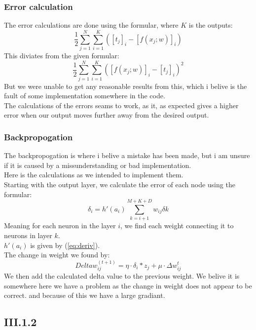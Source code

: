 \documentclass{article}
\begin{document}
\subsubsection{Error calculation}
The error calculations are done using the formular, where $K$ is the outputs:
\begin{equation} \label{eq:badError}
    \frac{1}{2} \sum_{j = 1}^{N}\sum_{i = 1}^{K}([t_j]_i - [f(x_j;w)]_i)
\end{equation}
This diviates from the given formular:
\begin{equation}
    \frac{1}{2} \sum_{j = 1}^{N} \sum_{i = 1}^{K}([f(x_j;w)]_i - [t_j]_i)^2
\end{equation}
But we were unable to get any reasonable results from this, which i belive is the fault of some implementation somewhere in the code.\\
The calculations of the errors seams to work, as it, as expected gives a higher error when our output moves further away from the desired output.\\

\subsubsection{Backpropogation}
The backpropogation is where i belive a mistake has been made, but i am unsure if it is caused by a missunderstanding or bad implementation.\\
Here is the calculations as we intended to implement them.\\
Starting with the output layer, we calculate the error of each node using the formular:
\begin{equation}
    \delta_i = h'(a_i) \sum_{k = i + 1}^{M + K + D}w_{ij} \delta{k}
\end{equation}
Meaning for each neuron in the layer $i$, we find each weight connecting it to neurons in layer $k$.\\
$h'(a_i)$ is given by (\ref{eq:deriv}).\\
The change in weight we found by:
\begin{equation}
    Delta w_{ij}^{(t + 1)} = \eta \cdot \delta_i * z_j + \mu \cdot \Delta w_{ij}^{t}
\end{equation}
We then add the calculated delta value to the previous weight. 
We belive it is somewhere here we have a problem as the change in 
weight does not appear to be correct. and because of this we have a
large gradiant.

\subsection{III.1.2}
\end{document}
